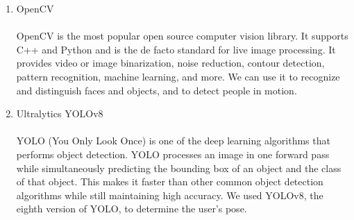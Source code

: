 \begin{enumerate}[label=\arabic*]
\begin{enumerate}[label=\alph*.]
              \item OpenCV\\
                    \\
                    OpenCV is the most popular open source computer vision library. It supports C++ and Python and is the de facto standard for live image processing. It provides video or image binarization, noise reduction, contour detection, pattern recognition, machine learning, and more. We can use it to recognize and distinguish faces and objects, and to detect people in motion. \\


              \item Ultralytics YOLOv8\\
                    \\YOLO (You Only Look Once) is one of the deep learning algorithms that performs object detection. YOLO processes an image in one forward pass while simultaneously predicting the bounding box of an object and the class of that object. This makes it faster than other common object detection algorithms while still maintaining high accuracy. We used YOLOv8, the eighth version of YOLO, to determine the user's pose.\\
          \end{enumerate}


\end{enumerate}
